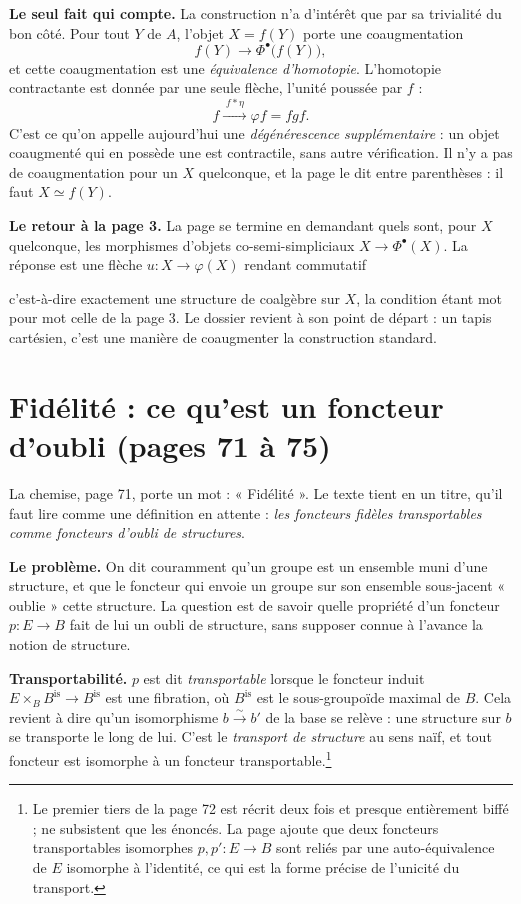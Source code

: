 \documentclass[11pt,a4paper]{article}
\begin{document}
\textbf{Le seul fait qui compte.} La construction n'a d'intérêt que par sa
trivialité du bon côté. Pour tout $Y$ de $A$, l'objet $X = f(Y)$ porte une
coaugmentation
\[
  f(Y) \longrightarrow \Phi^{\bullet}\bigl( f(Y) \bigr) ,
\]
et cette coaugmentation est une \emph{équivalence d'homotopie}. L'homotopie
contractante est donnée par une seule flèche, l'unité poussée par $f$ :
\[
  f \xrightarrow{\;f * \eta\;} \varphi f = fgf .
\]
C'est ce qu'on appelle aujourd'hui une \emph{dégénérescence supplémentaire} :
un objet coaugmenté qui en possède une est contractile, sans autre
vérification. Il n'y a pas de coaugmentation pour un $X$ quelconque, et la page
le dit entre parenthèses : il faut $X \simeq f(Y)$.


\textbf{Le retour à la page 3.} La page se termine en demandant quels sont, pour
$X$ quelconque, les morphismes d'objets co-semi-simpliciaux
$X \to \Phi^{\bullet}(X)$. La réponse est une flèche $u : X \to \varphi(X)$
rendant commutatif


c'est-à-dire exactement une structure de coalgèbre sur $X$, la condition étant
mot pour mot celle de la page 3. Le dossier revient à son point de départ : un
tapis cartésien, c'est une manière de coaugmenter la construction standard.

\section*{Fidélité : ce qu'est un foncteur d'oubli (pages 71 à 75)}

La chemise, page 71, porte un mot : « Fidélité ». Le texte tient en un titre,
qu'il faut lire comme une définition en attente : \emph{les foncteurs fidèles
transportables comme foncteurs d'oubli de structures}.


\textbf{Le problème.} On dit couramment qu'un groupe est un ensemble muni d'une
structure, et que le foncteur qui envoie un groupe sur son ensemble sous-jacent
« oublie » cette structure. La question est de savoir quelle propriété d'un
foncteur $p : E \to B$ fait de lui un oubli de structure, sans supposer connue
à l'avance la notion de structure.


\textbf{Transportabilité.} $p$ est dit \emph{transportable} lorsque le foncteur
induit $E \times_{B} B^{\mathrm{is}} \to B^{\mathrm{is}}$ est une fibration, où
$B^{\mathrm{is}}$ est le sous-groupoïde maximal de $B$. Cela revient à dire
qu'un isomorphisme $b \xrightarrow{\sim} b'$ de la base se relève : une
structure sur $b$ se transporte le long de lui. C'est le \emph{transport de
structure} au sens naïf, et tout foncteur est isomorphe à un foncteur
transportable.\footnote{Le premier tiers de la page 72 est récrit deux fois et
presque entièrement biffé ; ne subsistent que les énoncés. La page ajoute que
deux foncteurs transportables isomorphes $p, p' : E \to B$ sont reliés par une
auto-équivalence de $E$ isomorphe à l'identité, ce qui est la forme précise de
l'unicité du transport.}
\end{document}
